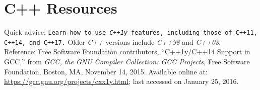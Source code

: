 









\chapter{C++ Resources}
\label{chp:CppResources}

	Quick advice: {\tt Learn how to use {\it C++1y} features, including those of {C++11}, {C++14}, and {C++17}.} Older {\it C++} versions include {\it C++98} and {\it C++03}. \\

	Reference: Free Software Foundation contributors, ``{C++1y/C++14} Support in {GCC},'' from {\it {GCC}, the {GNU} Compiler Collection: {GCC} Projects}, Free Software Foundation, Boston, MA, November 14, 2015. Available online at: \url{https://gcc.gnu.org/projects/cxx1y.html}; last accessed on January 25, 2016.

